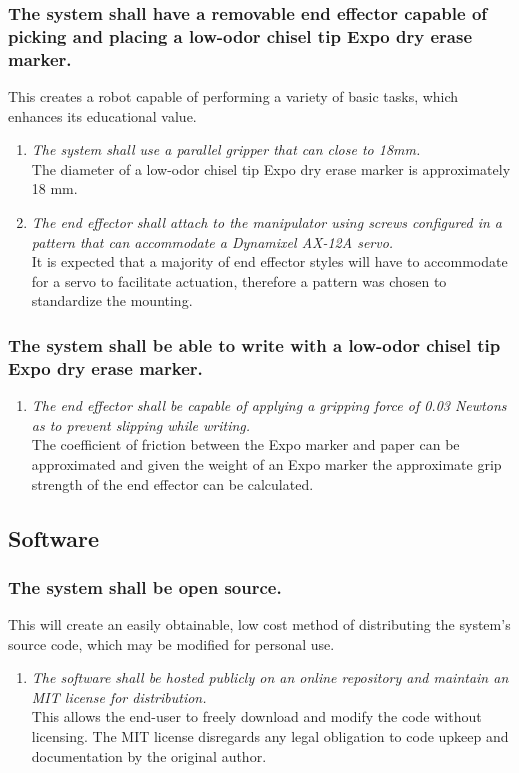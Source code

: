 \documentclass[12pt]{report}
\begin{document}
\subsubsection{The system shall have a removable end effector capable of picking and placing a low-odor chisel tip Expo dry erase marker.}
This creates a robot capable of performing a variety of basic tasks, which enhances its educational value.
\begin{enumerate}[label=\thesubsubsection.\alph*,leftmargin=3cm,font=\itshape]
  \item \textit{The system shall use a parallel gripper that can close to 18mm.} \\
  The diameter of a low-odor chisel tip Expo dry erase marker is approximately 18 mm.
  \item \textit{The end effector shall attach to the manipulator using screws configured in a pattern that can accommodate a Dynamixel AX-12A servo.} \\
  It is expected that a majority of end effector styles will have to accommodate for a servo to facilitate actuation, therefore a pattern was chosen to standardize the mounting.
\end{enumerate}

\subsubsection{The system shall be able to write with a low-odor chisel tip Expo dry erase marker.}
\begin{enumerate}[label=\thesubsubsection.\alph*,leftmargin=3cm,font=\itshape]
  \item \textit{The end effector shall be capable of applying a gripping force of 0.03 Newtons as to prevent slipping while writing.} \\
  The coefficient of friction between the Expo marker and paper can be approximated and given the weight of an Expo marker the approximate grip strength of the end effector can be calculated.
\end{enumerate}

\subsection{Software}
\subsubsection{The system shall be open source.}
This will create an easily obtainable, low cost method of distributing the system’s source code, which may be modified for personal use.
\begin{enumerate}[label=\thesubsubsection.\alph*,leftmargin=3cm,font=\itshape]
  \item \textit{The software shall be hosted publicly on an online repository and maintain an MIT license for distribution.} \\
  This allows the end-user to freely download and modify the code without licensing. The MIT license disregards any legal obligation to code upkeep and documentation by the original author.
\end{enumerate}
\end{document}
